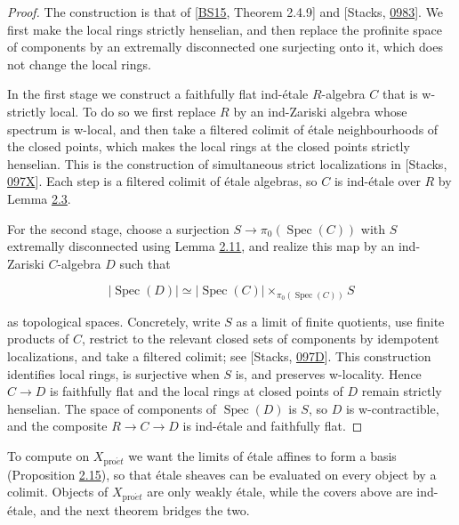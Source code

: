 \documentclass[11pt]{article}
\begin{document}
\begin{proof}[{Proof}]\label{bp40}%
The construction is that of [\hyperref[bp705]{BS15}, Theorem 2.4.9] and [Stacks, \href{https://stacks.math.columbia.edu/tag/0983}{0983}]. We first make the local rings strictly henselian, and then replace the profinite space of components by an extremally disconnected one surjecting onto it, which does not change the local rings.

In the first stage we construct a faithfully flat ind-étale \(R\)-algebra \(C\) that is w-strictly local. To do so we first replace \(R\) by an ind-Zariski algebra whose spectrum is w-local, and then take a filtered colimit of étale neighbourhoods of the closed points, which makes the local rings at the closed points strictly henselian. This is the construction of simultaneous strict localizations in [Stacks, \href{https://stacks.math.columbia.edu/tag/097X}{097X}]. Each step is a filtered colimit of étale algebras, so \(C\) is ind-étale over \(R\) by Lemma \hyperref[bp12]{2.3}.

For the second stage, choose a surjection \(S\to\pi_0(\operatorname{Spec}(C))\) with \(S\) extremally disconnected using Lemma \hyperref[bp33]{2.11}, and realize this map by an ind-Zariski \(C\)-algebra \(D\) such that

\[
|\operatorname{Spec}(D)|
\simeq |\operatorname{Spec}(C)|
\times_{\pi_0(\operatorname{Spec}(C))}S
\]

as topological spaces. Concretely, write \(S\) as a limit of finite quotients, use finite products of \(C\), restrict to the relevant closed sets of components by idempotent localizations, and take a filtered colimit; see [Stacks, \href{https://stacks.math.columbia.edu/tag/097D}{097D}]. This construction identifies local rings, is surjective when \(S\) is, and preserves w-locality. Hence \(C\to D\) is faithfully flat and the local rings at closed points of \(D\) remain strictly henselian. The space of components of \(\operatorname{Spec}(D)\) is \(S\), so \(D\) is w-contractible, and the composite \(R\to C\to D\) is ind-étale and faithfully flat.
\end{proof}

\label{bp41}%
To compute on \(X_{\mathrm{pro}\acute{e}t}\) we want the limits of étale affines to form a basis (Proposition \hyperref[bp46]{2.15}), so that étale sheaves can be evaluated on every object by a colimit. Objects of \(X_{\mathrm{pro}\acute{e}t}\) are only weakly étale, while the covers above are ind-étale, and the next theorem bridges the two.
\end{document}
